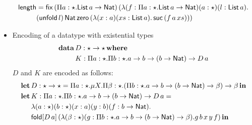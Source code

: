 \begin{itemize}
\begin{align*}
    \length &= \mathsf{fix}\,(\pai{a}{\star}{\List\,a \rightarrow \Nat})\,(\lambda(f : \pai{a}{\star}{\List\,a \rightarrow \Nat})(a:\star)(l : \List\,a).\\
            &(\unfold[\List\,a]{l})\,\Nat\,\zero\,(\lambda(x : a)(xs : \List\,a).\,\suc\,(f\,a\,xs)))
  \end{align*}
\item Encoding of a datatype with existential types
  \begin{align*}
    \data\,&D : \star \rightarrow \star\,\where \\
           &K : \pai{a}{\star}{\pai{b}{\star}{a \rightarrow b \rightarrow (b \rightarrow \Nat)} \rightarrow D\,a}
  \end{align*}
  $D$ and $K$ are encoded as follows:
  \begin{align*}
    \letbb\,&D:\star \rightarrow \star = \pai{a}{\star}\miu{X}{\pai{\beta}{\star}{(\pai{b}{\star}{a \rightarrow b \rightarrow (b \rightarrow \Nat) \rightarrow \beta}) \rightarrow \beta}}\,\inb \\
    \letbb\,&K:\pai{a}{\star}{\pai{b}{\star}{a \rightarrow b \rightarrow (b \rightarrow \Nat)} \rightarrow D\,a} = \\
            &\lambda (a:\star)(b:\star)(x:a)(y:b)(f:b \rightarrow \Nat).\\
            &\fold{D\,a}{(\lambda (\beta : \star)(g: \pai{b}{\star}{a \rightarrow b \rightarrow (b \rightarrow \Nat) \rightarrow \beta}).g\,b\,x\,y\,f)}\,\inb
  \end{align*}
\end{itemize}




